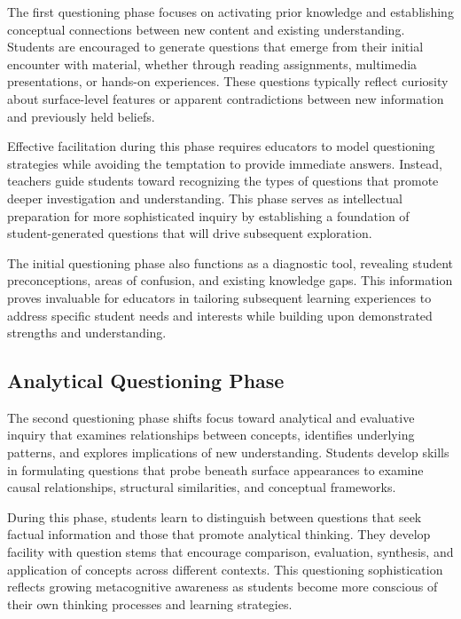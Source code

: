 \documentclass[
  Letterpaper,
]{scrbook}
\begin{document}
The first questioning phase focuses on activating prior knowledge and
establishing conceptual connections between new content and existing
understanding. Students are encouraged to generate questions that emerge
from their initial encounter with material, whether through reading
assignments, multimedia presentations, or hands-on experiences. These
questions typically reflect curiosity about surface-level features or
apparent contradictions between new information and previously held
beliefs.

Effective facilitation during this phase requires educators to model
questioning strategies while avoiding the temptation to provide
immediate answers. Instead, teachers guide students toward recognizing
the types of questions that promote deeper investigation and
understanding. This phase serves as intellectual preparation for more
sophisticated inquiry by establishing a foundation of student-generated
questions that will drive subsequent exploration.

The initial questioning phase also functions as a diagnostic tool,
revealing student preconceptions, areas of confusion, and existing
knowledge gaps. This information proves invaluable for educators in
tailoring subsequent learning experiences to address specific student
needs and interests while building upon demonstrated strengths and
understanding.

\subsection{Analytical Questioning
Phase}\label{analytical-questioning-phase}

The second questioning phase shifts focus toward analytical and
evaluative inquiry that examines relationships between concepts,
identifies underlying patterns, and explores implications of new
understanding. Students develop skills in formulating questions that
probe beneath surface appearances to examine causal relationships,
structural similarities, and conceptual frameworks.

During this phase, students learn to distinguish between questions that
seek factual information and those that promote analytical thinking.
They develop facility with question stems that encourage comparison,
evaluation, synthesis, and application of concepts across different
contexts. This questioning sophistication reflects growing metacognitive
awareness as students become more conscious of their own thinking
processes and learning strategies.
\end{document}

